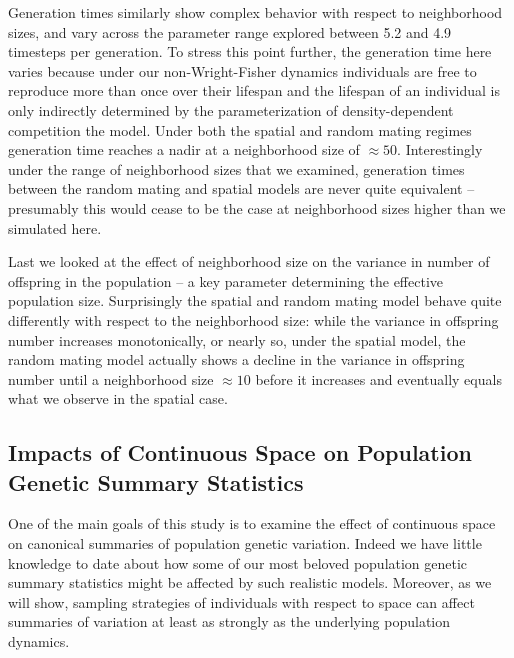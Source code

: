 \documentclass[11pt,twoside,lineno]{preprint}
\begin{document}
Generation times similarly show complex behavior with respect to neighborhood sizes, and vary across the parameter range explored between 5.2 and 4.9 timesteps per generation. To stress this point further, the generation time here varies because under our non-Wright-Fisher dynamics individuals are free to reproduce more than once over their lifespan and the lifespan of an individual is only indirectly determined by the parameterization of density-dependent competition the model. Under both the spatial and random mating regimes generation time reaches a nadir at a neighborhood size of $\approx 50$. Interestingly under the range of neighborhood sizes that we examined, generation times between the random mating and spatial models are never quite equivalent -- presumably this would cease to be the case at neighborhood sizes higher than we simulated here.

Last we looked at the effect of neighborhood size on the variance in number of offspring in the population -- a key parameter determining the effective population size. Surprisingly the spatial and random mating model behave quite differently with respect to the neighborhood size: while the variance in offspring number increases monotonically, or nearly so, under the spatial model, the random mating model actually shows a decline in the variance in offspring number until a neighborhood size $\approx 10$ before it increases and eventually equals what we observe in the spatial case. 


\subsection{Impacts of Continuous Space on Population Genetic Summary Statistics}
One of the main goals of this study is to examine the effect of continuous space on canonical summaries of population genetic variation. Indeed we have little knowledge to date about how some of our most beloved population genetic summary statistics might be affected by such realistic models. Moreover, as we will show, sampling strategies of individuals with respect to space can affect summaries of variation at least as strongly as the underlying population dynamics. 
\end{document}
